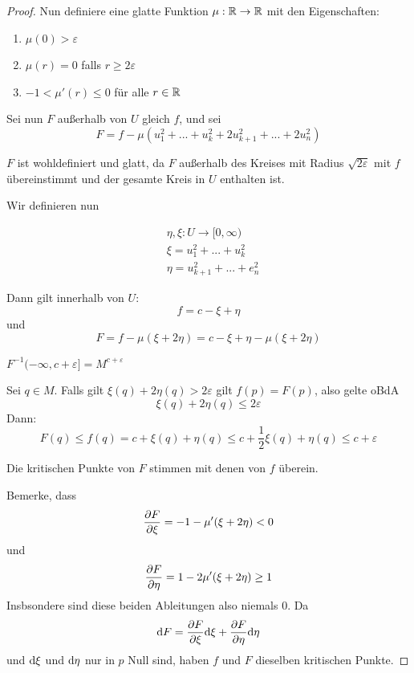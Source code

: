 \documentclass[a4paper,11pt]{article}
\begin{document}
\begin{proof}
    Nun definiere eine glatte Funktion $\mu: \R \to \R$ mit den Eigenschaften:

    \begin{enumerate}
        \item $ \mu(0) > \varepsilon $
        \item $ \mu(r) = 0 $ falls $ r \geq 2 \varepsilon $
        \item $ -1 < \mu'(r) \leq 0 $ für alle $ r \in \R $
    \end{enumerate}

    Sei nun $F$ außerhalb von $U$ gleich $f$, und sei
    \[ F = f - \mu(u_1^2 + ... + u_k^2 + 2u_{k+1}^2 + ... + 2u_n^2) \]

    $F$ ist wohldefiniert und glatt, da $F$ außerhalb des Kreises mit Radius 
    $\sqrt{2\varepsilon}$ mit $f$ übereinstimmt und der gesamte Kreis in $U$ 
    enthalten ist.

    Wir definieren nun

    \begin{align*}
        & \eta, \xi: U \to [0, \infty) \\
        & \xi = u_1^2 + ... + u_k^2 \\
        & \eta = u_{k + 1}^2 + ... + e_n^2
    \end{align*}

    Dann gilt innerhalb von $U$:
    \[ f = c - \xi + \eta \]
    und 
    \[ F = f - \mu(\xi + 2 \eta) = c - \xi + \eta - \mu(\xi + 2 \eta) \]

     $F^{-1}(-\infty, c + \varepsilon] = M^{c + \varepsilon}$

    Sei $q \in M$. Falls gilt $\xi(q) + 2 \eta(q) > 2 \varepsilon$ gilt $f(p) = F(p)$,
    also gelte oBdA 
    \[ \xi(q) + 2 \eta(q) \leq 2 \varepsilon \]
    Dann:
    \[ F(q) \leq f(q) = c + \xi(q) + \eta(q) \leq c + \frac{1}{2}\xi(q) + \eta(q) \leq c + \varepsilon \]
    \sectiondone

     Die kritischen Punkte von $F$ stimmen mit denen 
    von $f$ überein.

    Bemerke, dass
    \[ \pderive[F]{\xi} = -1 - \mu'(\xi + 2\eta)  < 0 \]
    und
    \[ \pderive[F]{\eta} = 1 - 2 \mu'(\xi + 2\eta) \geq 1 \]
    Insbsondere sind diese beiden Ableitungen also niemals $0$. Da 
    \[ \opd F = \pderive[F]{\xi}\opd \xi + \pderive[F]{\eta} \opd \eta \]
    und $\opd \xi$ und $\opd \eta$ nur in $p$ Null sind, haben $f$ und $F$ 
    dieselben kritischen Punkte.
    \sectiondone


\end{proof}
\end{document}
